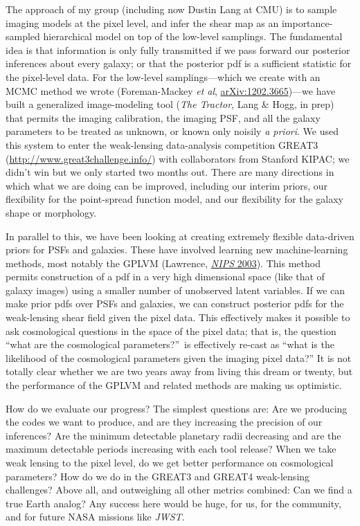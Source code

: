 \documentclass[11pt, letterpaper]{article}
\newcommand{\arxiv}[1]{\href{http://arxiv.org/abs/#1}{arXiv:#1}}
\begin{document}
The approach of my group (including now Dustin Lang at CMU) is to sample
imaging models at the pixel level, and infer the shear map as an
importance-sampled hierarchical model on top of the low-level
samplings.
The fundamental idea is that information is only fully transmitted if
we pass forward our posterior inferences about every galaxy; or that the
posterior pdf is a sufficient statistic for the pixel-level data.
For the low-level samplings---which we create with an MCMC method we
wrote (Foreman-Mackey \textit{et al}, \arxiv{1202.3665})---we have
built a generalized image-modeling tool (\textsl{The Tractor}, Lang \&
Hogg, in prep) that permits the imaging calibration, the imaging PSF,
and all the galaxy parameters to be treated as unknown, or known only noisily
\textit{a priori}.
We used this system to enter the weak-lensing data-analysis
competition GREAT3 (\url{http://www.great3challenge.info/})
with collaborators from Stanford KIPAC;
we didn't win but we only started two months out.
There are many directions in which what we are doing can be improved,
including our interim priors, our flexibility for the point-spread
function model, and our flexibility for the galaxy shape or
morphology.

In parallel to this, we have been looking at creating
extremely flexible data-driven priors for PSFs and galaxies.
These have involved learning new machine-learning methods,
most notably the GPLVM
(Lawrence, \href{http://papers.nips.cc/paper/2540-gaussian-process-latent-variable-models-for-visualisation-of-high-dimensional-data.pdf}{\textit{NIPS} 2003}).
This method permits construction of a pdf
in a very high dimensional space (like that of galaxy images)
using a smaller number of unobserved latent variables.
If we can make prior pdfs over PSFs and galaxies, we can construct
posterior pdfs for the weak-lensing shear field given the pixel data.
This effectively makes it possible to ask cosmological questions in
the space of the pixel data; that is, the question ``what are the
cosmological parameters?''\ is effectively re-cast as ``what is the
likelihood of the cosmological parameters given the imaging pixel data?''
It is not totally clear whether we are two years away from living this dream
or twenty, but the performance of the GPLVM and related methods are
making us optimistic.

How do we evaluate our progress?
The simplest questions are: Are we producing the codes we want to
produce, and are they increasing the precision of our inferences?
Are the minimum detectable planetary radii decreasing and are the
maximum detectable periods increasing with each tool release?
When we take weak lensing to the pixel level, do we get better
performance on cosmological parameters?
How do we do in the GREAT3 and GREAT4 weak-lensing challenges?
Above all, and outweighing all other metrics combined:
Can we find a true Earth analog?
Any success here would be huge, for us, for the community, and for
future NASA missions like \textsl{JWST}.
\end{document}
